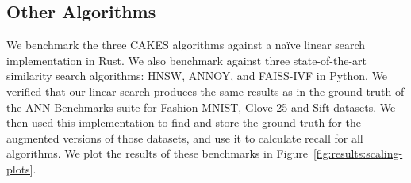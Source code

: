




\subsection{Other Algorithms}
\label{sec:datasets-and-benchmarks:other-algorithms}

We benchmark the three CAKES algorithms against a na\"ive linear search implementation in Rust.
We also benchmark against three state-of-the-art similarity search algorithms: HNSW, ANNOY, and FAISS-IVF in Python.
We verified that our linear search produces the same results as in the ground truth of the ANN-Benchmarks suite for Fashion-MNIST, Glove-25 and Sift datasets.
We then used this implementation to find and store the ground-truth for the augmented versions of those datasets, and use it to calculate recall for all algorithms.
We plot the results of these benchmarks in Figure~\ref{fig:results:scaling-plots}.
